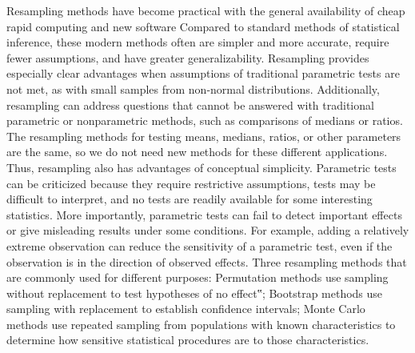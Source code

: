 \documentclass{article}
\begin{document}
Resampling methods have become practical with the general availability of cheap rapid
computing and new software Compared to standard methods of statistical inference, these
modern methods often are simpler and more accurate, require fewer assumptions, and have
greater generalizability. Resampling provides especially clear advantages when assumptions of
traditional parametric tests are not met, as with small samples from non-normal distributions.
Additionally, resampling can address questions that cannot be answered with traditional
parametric or nonparametric methods, such as comparisons of medians or ratios. The resampling
methods for testing means, medians, ratios, or other parameters are the same, so we do not need
new methods for these different applications. Thus, resampling also has advantages of
conceptual simplicity.
Parametric tests can be criticized because they require restrictive assumptions, tests may be
difficult to interpret, and no tests are readily available for some interesting statistics. More
importantly, parametric tests can fail to detect important effects or give misleading results under
some conditions. For example, adding a relatively extreme observation can reduce the sensitivity
of a parametric test, even if the observation is in the direction of observed effects. 
Three resampling methods that are commonly used for different purposes:
Permutation methods use sampling without replacement to test hypotheses of no effect‟;
Bootstrap methods use sampling with replacement to establish confidence intervals;
Monte Carlo methods use repeated sampling from populations with known characteristics to
determine how sensitive statistical procedures are to those characteristics.
\end{document}

